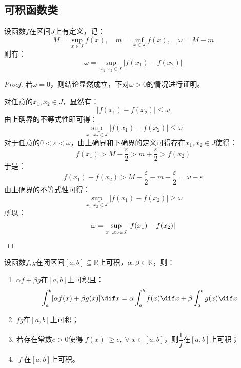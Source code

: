 \subsection{可积函数类}
\begin{lemma}\label{lem:omega=SupVari}
	设函数$f$在区间$J$上有定义，记：
	\begin{equation*}
		M=\sup_{x\in J}f(x),\quad m=\inf_{x\in J}f(x),\quad\omega=M-m
	\end{equation*}
	则有：
	\begin{equation*}
		\omega=\sup_{x_1,x_2\in J}|f(x_1)-f(x_2)|
	\end{equation*}
\end{lemma}
\begin{proof}
	若$\omega=0$，则结论显然成立，下对$\omega>0$的情况进行证明。\par
	对任意的$x_1,x_2\in J$，显然有：
	\begin{equation*}
		|f(x_1)-f(x_2)|\leqslant\omega
	\end{equation*}
	由上确界的不等式性即可得：
	\begin{equation*}
		\sup_{x_1,x_2\in J}|f(x_1)-f(x_2)|\leqslant\omega
	\end{equation*}
	对于任意的$0<\varepsilon<\omega$，由上确界和下确界的定义可得存在$x_1,x_2\in J$使得：
	\begin{equation*}
		f(x_1)>M-\frac{\varepsilon}{2}>m+\frac{\varepsilon}{2}>f(x_2)
	\end{equation*}
	于是：
	\begin{equation*}
		f(x_1)-f(x_2)>M-\frac{\varepsilon}{2}-m-\frac{\varepsilon}{2}=\omega-\varepsilon
	\end{equation*}
	由上确界的不等式性可得：
	\begin{equation*}
		\sup_{x_1,x_2\in J}|f(x_1)-f(x_2)|\geqslant\omega
	\end{equation*}
	所以：
	\begin{equation*}
		\omega=\sup_{x_1,x_2\in J}|f(x_1)-f(x_2)|\qedhere
	\end{equation*}
\end{proof}
\begin{theorem}\label{theo:RiemannIntegrable4ArithmeticOperation}
	设函数$f,g$在闭区间$[a,b]\subseteq\mathbb{R}^{}$上可积，$\alpha,\beta\in\mathbb{R}^{}$，则：
	\begin{enumerate}
		\item $\alpha f+\beta g$在$[a,b]$上可积且：
		\begin{equation*}
			\int_{a}^b[\alpha f(x)+\beta g(x)]\dif x=\alpha\int_{a}^bf(x)\dif x+\beta\int_{a}^bg(x)\dif x
		\end{equation*}
		\item $fg$在$[a,b]$上可积；
		\item 若存在常数$c>0$使得$|f(x)|\geqslant c,\;\forall\;x\in[a,b]$，则$\dfrac{1}{f}$在$[a,b]$上可积；
		\item $|f|$在$[a,b]$上可积。
	\end{enumerate}
\end{theorem}
